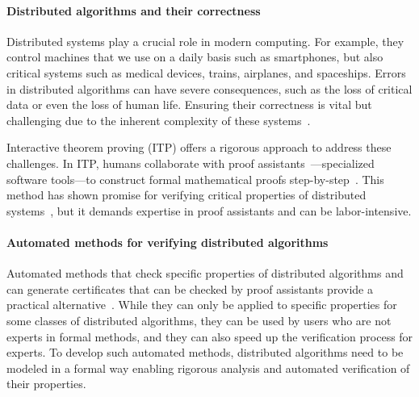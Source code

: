 
\paragraph{Distributed algorithms and their correctness}
Distributed systems play a crucial role in modern computing.
For example, they control machines that we use on a daily basis such as smartphones, but also critical systems such as medical devices, trains, airplanes, and spaceships. Errors in distributed algorithms can have severe consequences, such as the loss of critical data or even the loss of human life. Ensuring their correctness is vital but challenging due to the inherent complexity of these systems~\cite{heiser2010theroad, lamport2019thebyzantine}. 


Interactive theorem proving (ITP) offers a rigorous approach to address these challenges. In ITP, humans collaborate with proof assistants~\cite{nipkow2002isabelle, bertot2004coq, moura2021lean4}—specialized software tools—to construct formal mathematical proofs step-by-step~\cite{harrison2014history}.
This method has shown promise for verifying critical properties of distributed systems~\cite{plump2024formalisingDPO,potop2019formal,courtieu2016certified}, but it demands expertise in proof assistants and can be labor-intensive.

\paragraph{Automated methods for verifying distributed algorithms}
 Automated methods that check specific properties of distributed algorithms and can generate certificates that can be checked by proof assistants provide a practical alternative~\cite{contejean2011automated,giesl2014proving}. While they can only be applied to specific properties for some classes of distributed algorithms, they can be used by users who are not experts in formal methods, and they can also speed up the verification process for experts. To develop such automated methods, distributed algorithms need to be modeled in a formal way enabling rigorous analysis and automated verification of their properties.


